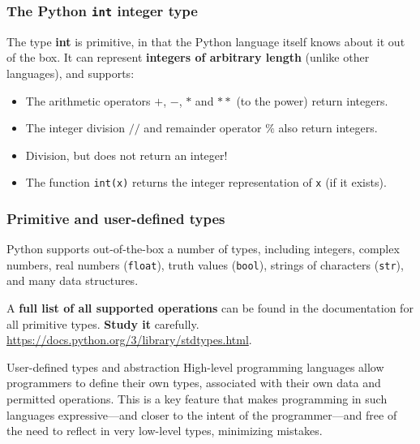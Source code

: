\documentclass{beamer} %
\newcommand\emc[1]{\textcolor{midred}{\textbf{#1}}}
\begin{document}
\begin{frame}
\frametitle{The Python \texttt{int} integer type} 

The type \emc{int} is primitive, in that the Python language itself knows about it out of the box. It can represent \emc{integers of arbitrary length} (unlike other languages), and supports:
\begin{itemize}
\item The arithmetic operators $+$, $-$, $*$ and $**$ (to the power) return integers.
\item The integer division $//$ and remainder operator $\%$ also return integers.
\item Division, but does not return an integer!
\item The function \texttt{int(x)} returns the integer representation of \texttt{x} (if it exists).
\end{itemize}

\end{frame}

\begin{frame}
\frametitle{Primitive and user-defined types} 

Python supports out-of-the-box a number of types, including integers, complex numbers, real numbers (\texttt{float}), truth values (\texttt{bool}), strings of characters (\texttt{str}), and many data structures.

\vspace{5mm}
A \emc{full list of all supported operations} can be found in the documentation for all primitive types. \emc{Study it} carefully. \url{https://docs.python.org/3/library/stdtypes.html}.


\begin{block}{User-defined types and abstraction}
High-level programming languages allow programmers to define their own types, associated with their own data and permitted operations. This is a key feature that makes programming in such languages expressive---and closer to the intent of the programmer---and free of the need to reflect in very low-level types, minimizing mistakes.
\end{block}

\end{frame}
\end{document}
